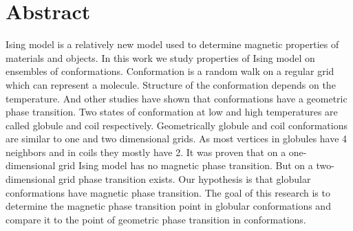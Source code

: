 \section*{Abstract}
Ising model is a relatively new model used to determine magnetic properties of materials and objects. In this work we study properties of Ising model on ensembles of conformations. Conformation is a random walk on a regular grid which can represent a molecule. Structure of the conformation depends on the temperature. And other studies have shown that conformations have a geometric phase transition. Two states of conformation at low and high temperatures are called globule and coil respectively. Geometrically globule and coil conformations are similar to one and two dimensional grids. As most vertices in globules have 4 neighbors and in coils they mostly have 2. It was proven that on a one-dimensional grid Ising model has no magnetic phase transition. But on a two-dimensional grid phase transition exists. Our hypothesis is that globular conformations have magnetic phase transition. The goal of this research is to determine the magnetic phase transition point in globular conformations and compare it to the point of geometric phase transition in conformations.